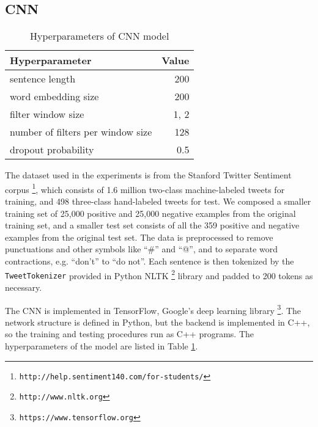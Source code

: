 \subsection{CNN}

\begin{table}[htb]
\centering
\begin{tabular}{| l | r |}
\hline
{\bf Hyperparameter} & {\bf Value}  \\ \hline
sentence length & 200 \\ \hline
word embedding size & 200 \\ \hline
filter window size & 1, 2 \\ \hline
number of filters per window size & 128 \\ \hline
dropout probability & 0.5 \\
\hline
\end{tabular}
\caption{Hyperparameters of CNN model}\label{tbl.cnn.param}
\end{table}

The dataset used in the experiments is from the Stanford Twitter Sentiment corpus \footnote{\tt http://help.sentiment140.com/for-students/}, which consists of 1.6 million two-class machine-labeled tweets for training, and 498 three-class hand-labeled tweets for test. We composed a smaller training set of 25,000 positive and 25,000 negative examples from the original training set, and a smaller test set consists of all the 359 positive and negative examples from the original test set. The data is preprocessed to remove punctuations and other symbols like ``\#'' and ``@'', and to separate word contractions, e.g. ``don't'' to ``do not''. Each sentence is then tokenized by the {\tt TweetTokenizer} provided in Python NLTK \footnote{\tt http://www.nltk.org} library and padded to 200 tokens as necessary. 

The CNN is implemented in TensorFlow, Google's deep learning library \footnote{\tt https://www.tensorflow.org}. The network structure is defined in Python, but the backend is implemented in C++, so the training and testing procedures run as C++ programs. The hyperparameters of the model are listed in Table \ref{tbl.cnn.param}. 

